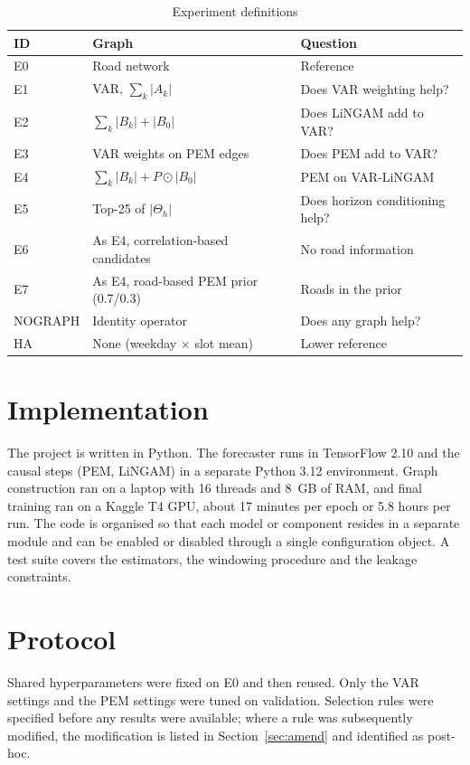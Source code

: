 \documentclass[MTech]{ugthesis}
\begin{document}
\begin{table}[h]
\centering
\caption{Experiment definitions}
\begin{tabular}{lll}
\hline
ID & Graph & Question \\
\hline
E0 & Road network & Reference \\
E1 & VAR, $\sum_k|A_k|$ & Does VAR weighting help? \\
E2 & $\sum_k|B_k|+|B_0|$ & Does LiNGAM add to VAR? \\
E3 & VAR weights on PEM edges & Does PEM add to VAR? \\
E4 & $\sum_k|B_k|+P\odot|B_0|$ & PEM on VAR-LiNGAM \\
E5 & Top-25 of $|\Theta_h|$ & Does horizon conditioning help? \\
E6 & As E4, correlation-based candidates & No road information \\
E7 & As E4, road-based PEM prior (0.7/0.3) & Roads in the prior \\
NOGRAPH & Identity operator & Does any graph help? \\
HA & None (weekday $\times$ slot mean) & Lower reference \\
\hline
\end{tabular}
\label{tab:exp}
\end{table}

\section{Implementation}
The project is written in Python. The forecaster runs in TensorFlow 2.10 and the causal steps (PEM, LiNGAM) in a separate Python 3.12 environment. Graph construction ran on a laptop with 16 threads and 8~GB of RAM, and final training ran on a Kaggle T4 GPU, about 17 minutes per epoch or 5.8 hours per run. The code is organised so that each model or component resides in a separate module and can be enabled or disabled through a single configuration object. A test suite covers the estimators, the windowing procedure and the leakage constraints.

\section{Protocol}
Shared hyperparameters were fixed on E0 and then reused. Only the VAR settings and the PEM settings were tuned on validation. Selection rules were specified before any results were available; where a rule was subsequently modified, the modification is listed in Section~\ref{sec:amend} and identified as post-hoc.
\end{document}
